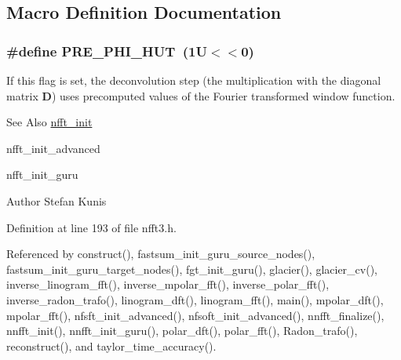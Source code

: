 \subsection{Macro Definition Documentation}
\hypertarget{group__nfft_gada3a356fdaf5840f98374a0a7aaf3e9c}{
\subsubsection[{P\-R\-E\-\_\-\-P\-H\-I\-\_\-\-H\-U\-T}]{\setlength{\rightskip}{0pt plus 5cm}\#define P\-R\-E\-\_\-\-P\-H\-I\-\_\-\-H\-U\-T~(1\-U$<$$<$0)}}\label{group__nfft_gada3a356fdaf5840f98374a0a7aaf3e9c}
If this flag is set, the deconvolution step (the multiplication with the diagonal matrix $\mathbf{D}$) uses precomputed values of the Fourier transformed window function.

\begin{DoxySeeAlso}{See Also}
\hyperlink{group__nfft_ga1dfeaf18f3735f035afa62ca768d99c4}{nfft\-\_\-init} 

nfft\-\_\-init\-\_\-advanced 

nfft\-\_\-init\-\_\-guru 
\end{DoxySeeAlso}
\begin{DoxyAuthor}{Author}
Stefan Kunis 
\end{DoxyAuthor}


Definition at line 193 of file nfft3.\-h.



Referenced by construct(), fastsum\-\_\-init\-\_\-guru\-\_\-source\-\_\-nodes(), fastsum\-\_\-init\-\_\-guru\-\_\-target\-\_\-nodes(), fgt\-\_\-init\-\_\-guru(), glacier(), glacier\-\_\-cv(), inverse\-\_\-linogram\-\_\-fft(), inverse\-\_\-mpolar\-\_\-fft(), inverse\-\_\-polar\-\_\-fft(), inverse\-\_\-radon\-\_\-trafo(), linogram\-\_\-dft(), linogram\-\_\-fft(), main(), mpolar\-\_\-dft(), mpolar\-\_\-fft(), nfsft\-\_\-init\-\_\-advanced(), nfsoft\-\_\-init\-\_\-advanced(), nnfft\-\_\-finalize(), nnfft\-\_\-init(), nnfft\-\_\-init\-\_\-guru(), polar\-\_\-dft(), polar\-\_\-fft(), Radon\-\_\-trafo(), reconstruct(), and taylor\-\_\-time\-\_\-accuracy().

